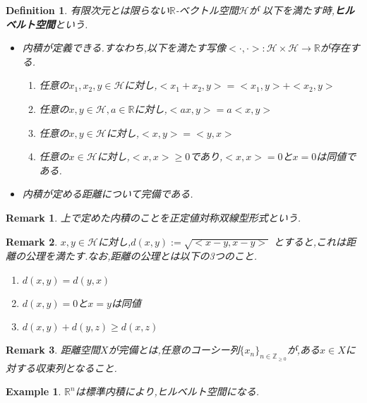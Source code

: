\documentclass{ujarticle}
\newtheorem{dfn}[thm]{Definition}
\newtheorem{epl}[thm]{Example}
\newtheorem*{rem}{Remark}
\begin{document}
\begin{dfn}
  有限次元とは限らない$\mathbb{R}$-ベクトル空間$\mathcal{H}$が
  以下を満たす時,\textbf{ヒルベルト空間}という.
  \begin{itemize}
    \item 内積が定義できる.すなわち,以下を満たす写像$< \cdot , \cdot >: \mathcal{H} \times \mathcal{H} \to \mathbb{R}$が存在する.
      \begin{enumerate}
        \item 任意の$x_1,x_2,y \in \mathcal{H}$に対し,${<}x_1 +x_2,y{>}= {<}x_1,y{>} +{<}x_2,y{>}$
        \item 任意の$x,y \in \mathcal{H},a \in \mathbb{R}$に対し,$<ax,y> =a<x,y>$
        \item 任意の$x,y \in \mathcal{H}$に対し,$<x,y>=<y,x>$
        \item 任意の$x \in \mathcal{H}$に対し,${<}x,x{>} \ge 0$であり,${<}x,x{>}=0$と$x=0$は同値である.
      \end{enumerate}
    \item 内積が定める距離について完備である.
  \end{itemize}
\end{dfn}
\begin{rem}
上で定めた内積のことを正定値対称双線型形式という.
\end{rem}
\begin{rem}
  $x,y \in \mathcal{H}$に対し,$d(x,y):=\sqrt{{<}x-y,x-y{>}}$
 とすると,これは距離の公理を満たす.なお,距離の公理とは以下の3つのこと.
 \begin{enumerate}
   \item $d(x,y)=d(y,x)$
   \item $d(x,y)=0$と$x=y$は同値
   \item $d(x,y)+d(y,z) \ge d(x,z)$
 \end{enumerate}
\end{rem}
\begin{rem}
 距離空間$X$が完備とは,任意のコーシー列$\{x_n\}_{n \in \mathbb{Z}_{\ge 0}}$が,ある$x \in X$に対する収束列となること.
\end{rem}
\begin{epl}
 $\mathbb{R}^n$は標準内積により,ヒルベルト空間になる.
\end{epl}
\end{document}
